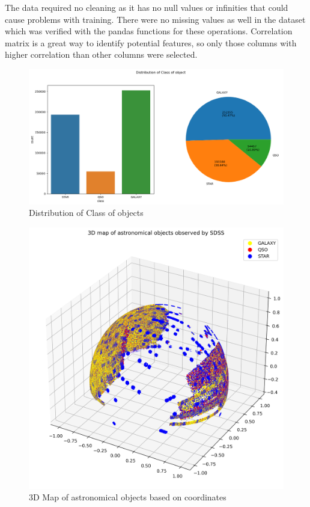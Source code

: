 The data required no cleaning as it has no null values or infinities that could cause problems with training. There were no missing values as well in the dataset which was verified with the pandas functions for these operations. Correlation matrix is a great way to identify potential features, so only those columns with higher correlation than other columns were selected. 
\begin{figure}
    \centering
    \includegraphics[scale=0.5]{images/Distribution of class.png}
    \caption{Distribution of Class of objects}
    \label{fig:classdistribution}
\end{figure}


\begin{figure}
    \centering
    \includegraphics[scale=0.7]{images/3dmap.png}
    \caption{3D Map of astronomical objects based on coordinates}
    \label{fig:3dmap}
\end{figure}




